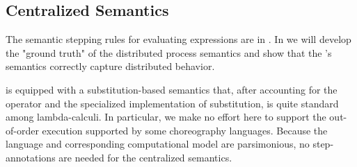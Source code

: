 \subsection{Centralized Semantics}\label{sec:semantics}

The semantic stepping rules for evaluating \HLSCentral expressions
are in .
In 
we will develop the "ground truth" of the distributed process semantics and show that
the \HLSCentral's semantics correctly capture distributed behavior.

\HLSCentral is equipped with a substitution-based semantics that,
after accounting for the \mask operator and the specialized implementation of
substitution, is quite standard among lambda-calculi.
In particular, we make no effort here to support the out-of-order execution
supported by some choreography languages.
Because the language and corresponding computational model are parsimonious,
no step-annotations are needed for the centralized semantics.

